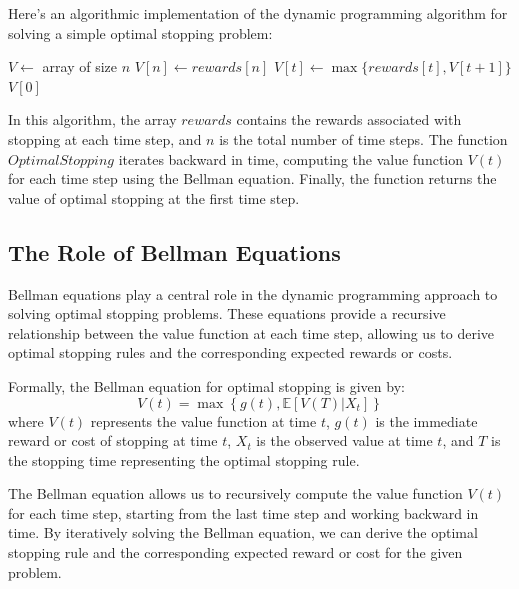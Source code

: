 \documentclass[12pt]{book} %
\begin{document}
Here's an algorithmic implementation of the dynamic programming algorithm for solving a simple optimal stopping problem:
\FloatBarrier
\begin{algorithm}
\caption{Dynamic Programming Algorithm for Optimal Stopping}
\begin{algorithmic}[1]
    \State $V \gets$ array of size $n$ 
    \State $V[n] \gets rewards[n]$ 
     
        \State $V[t] \gets \max \{rewards[t], V[t+1]\}$ 
    \EndFor
    \State \Return $V[0]$ 
\EndFunction
\end{algorithmic}
\end{algorithm}
\FloatBarrier

In this algorithm, the array $rewards$ contains the rewards associated with stopping at each time step, and $n$ is the total number of time steps. The function $OptimalStopping$ iterates backward in time, computing the value function $V(t)$ for each time step using the Bellman equation. Finally, the function returns the value of optimal stopping at the first time step.

\subsection{The Role of Bellman Equations}

Bellman equations play a central role in the dynamic programming approach to solving optimal stopping problems. These equations provide a recursive relationship between the value function at each time step, allowing us to derive optimal stopping rules and the corresponding expected rewards or costs.

Formally, the Bellman equation for optimal stopping is given by:
\[
V(t) = \max \left\{ g(t), \mathbb{E}[V(T) | X_t] \right\}
\]
where \( V(t) \) represents the value function at time \( t \), \( g(t) \) is the immediate reward or cost of stopping at time \( t \), \( X_t \) is the observed value at time \( t \), and \( T \) is the stopping time representing the optimal stopping rule.

The Bellman equation allows us to recursively compute the value function \( V(t) \) for each time step, starting from the last time step and working backward in time. By iteratively solving the Bellman equation, we can derive the optimal stopping rule and the corresponding expected reward or cost for the given problem.
\end{document}

